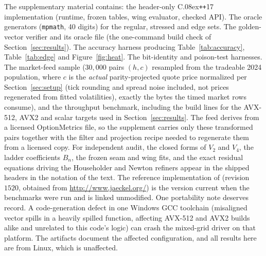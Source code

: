\documentclass[11pt]{article}
\begin{document}
The supplementary material contains: the header-only C\raise.08ex\hbox{\tt ++}17 implementation (runtime, frozen tables, wing evaluator, checked API). The oracle generators (\texttt{mpmath}, 40 digits) for the regular, stressed and edge sets. The golden-vector verifier and its oracle file (the one-command build check of Section~\ref{sec:results}). The accuracy harness producing Table~\ref{tab:accuracy}, Table~\ref{tab:edge} and Figure~\ref{fig:heat}. The bit-identity and poison-test harnesses. The market-feed sample ($30{,}000$ pairs $(h,c)$ resampled from the tradeable 2024 population, where $c$ is the \emph{actual} parity-projected quote price normalized per Section~\ref{sec:setup} (tick rounding and spread noise included, not prices regenerated from fitted volatilities), exactly the bytes the timed market rows consume), and the throughput benchmark, including the build lines for the AVX-512, AVX2 and scalar targets used in Section~\ref{sec:results}. The feed derives from a licensed OptionMetrics file, so the supplement carries only these transformed pairs together with the filter and projection recipe needed to regenerate them from a licensed copy. For independent audit, the closed forms of $V_2$ and $V_4$, the ladder coefficients $B_n$, the frozen seam and wing fits, and the exact residual equations driving the Householder and Newton refiners appear in the shipped headers in the notation of the text. The reference implementation of \citet{jackel2015rational} (revision~$1520$, obtained from \url{http://www.jaeckel.org/}) is the version current when the benchmarks were run and is linked unmodified. One portability note deserves record. A code-generation defect in one Windows GCC toolchain (misaligned vector spills in a heavily spilled function, affecting AVX-512 and AVX2 builds alike and unrelated to this code's logic) can crash the mixed-grid driver on that platform. The artifacts document the affected configuration, and all results here are from Linux, which is unaffected.
\end{document}

